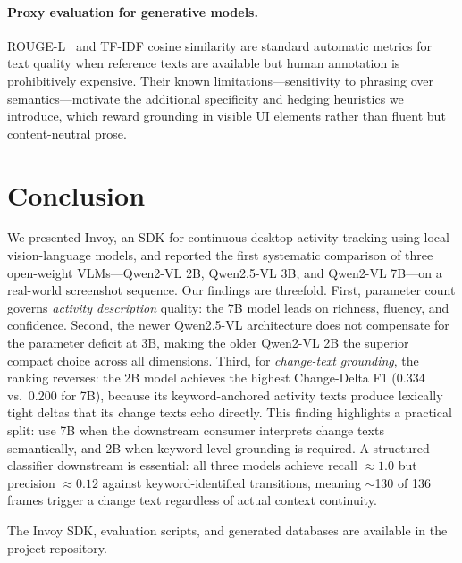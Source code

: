 \documentclass[10pt, twocolumn]{article}
\begin{document}
\paragraph{Proxy evaluation for generative models.}
ROUGE-L~\cite{lin2004rouge} and TF-IDF cosine similarity are standard automatic
metrics for text quality when reference texts are available but human annotation
is prohibitively expensive. Their known limitations---sensitivity to phrasing over
semantics---motivate the additional specificity and hedging heuristics we introduce,
which reward grounding in visible UI elements rather than fluent but
content-neutral prose.

\section{Conclusion}
\label{sec:conclusion}

We presented Invoy, an SDK for continuous desktop activity tracking using local
vision-language models, and reported the first systematic comparison of three
open-weight VLMs---Qwen2-VL 2B, Qwen2.5-VL 3B, and Qwen2-VL 7B---on a real-world
screenshot sequence. Our findings are threefold. First, parameter count governs \emph{activity description}
quality: the 7B model leads on richness, fluency, and confidence. Second, the newer
Qwen2.5-VL architecture does not compensate for the parameter deficit at 3B, making
the older Qwen2-VL 2B the superior compact choice across all dimensions. Third, for
\emph{change-text grounding}, the ranking reverses: the 2B model achieves the highest
Change-Delta F1 (0.334 vs.\ 0.200 for 7B), because its keyword-anchored activity
texts produce lexically tight deltas that its change texts echo directly. This
finding highlights a practical split: use 7B when the downstream consumer interprets
change texts semantically, and 2B when keyword-level grounding is required.
A structured classifier downstream is essential: all three models achieve recall
$\approx 1.0$ but precision $\approx 0.12$ against keyword-identified transitions,
meaning $\sim$130 of 136 frames trigger a change text regardless of actual context
continuity.

The Invoy SDK, evaluation scripts, and generated databases are available in the
project repository.
\end{document}
